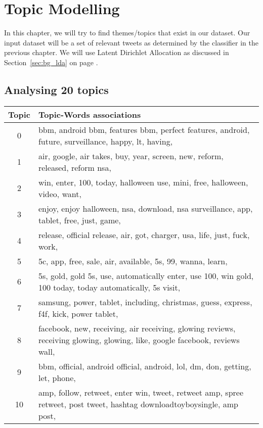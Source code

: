 \chapter{Topic Modelling}
\label{cha:topic_modelling}
In this chapter, we will try to find themes/topics that exist in our dataset. Our input dataset will
be a set of relevant tweets as determined by the classifier in the previous chapter. We will use
Latent Dirichlet Allocation as discussed in Section~\ref{sec:bg_lda} on page \pageref{sec:bg_lda}.

\section{Analysing 20 topics}
\label{sec:analysing_20_topics}
\begin{table}
  \begin{tabular}{c p{16cm}} \toprule
    Topic & Topic-Words associations \\ \midrule
    0     & bbm, android bbm, features bbm, perfect features, android, future, surveillance, happy, lt, having, \\ \midrule
    1     & air, google, air takes, buy, year, screen, new, reform, released, reform nsa, \\ \midrule
    2     & win, enter, 100, today, halloween use, mini, free, halloween, video, want, \\ \midrule
    3     & enjoy, enjoy halloween, nsa, download, nsa surveillance, app, tablet, free, just, game, \\ \midrule
    4     & release, official release, air, got, charger, usa, life, just, fuck, work, \\ \midrule
    5     & 5c, app, free, sale, air, available, 5s, 99, wanna, learn, \\ \midrule
    6     & 5s, gold, gold 5s, use, automatically enter, use 100, win gold, 100 today, today automatically, 5s visit, \\ \midrule
    7     & samsung, power, tablet, including, christmas, guess, express, f4f, kick, power tablet, \\ \midrule
    8     & facebook, new, receiving, air receiving, glowing reviews, receiving glowing, glowing, like, google facebook, reviews wall, \\ \midrule
    9     & bbm, official, android official, android, lol, dm, don, getting, let, phone, \\ \midrule
    10    & amp, follow, retweet, enter win, tweet, retweet amp, spree retweet, post tweet, hashtag downloadtoyboysingle, amp post, \\ \midrule

\end{tabular}
\end{table}
